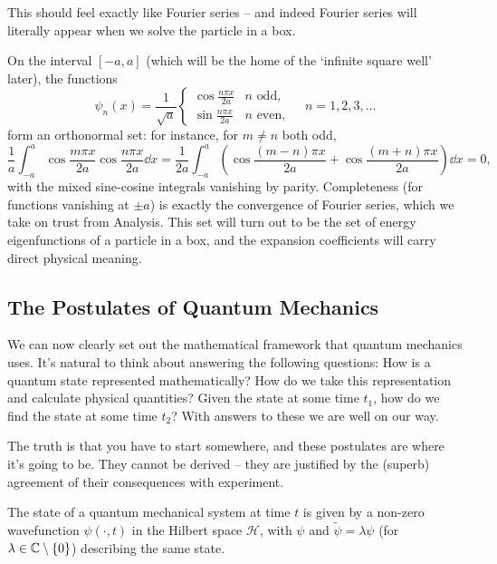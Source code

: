 \documentclass[a4paper]{scrartcl}
\begin{document}
This should feel exactly like Fourier series -- and indeed Fourier series will literally appear when we solve the particle in a box.

\begin{example}
    On the interval $[-a, a]$ (which will be the home of the `infinite square well' later), the functions
    $$
    \psi_n(x) = \frac{1}{\sqrt{a}} \begin{cases} \cos \frac{n \pi x}{2a} & n \text{ odd}, \\[2pt] \sin \frac{n \pi x}{2a} & n \text{ even}, \end{cases} \quad n = 1, 2, 3, \dots
    $$
    form an orthonormal set: for instance, for $m \neq n$ both odd,
    $$
    \frac{1}{a}\int_{-a}^{a} \cos \frac{m \pi x}{2a} \cos \frac{n \pi x}{2a} \dd x = \frac{1}{2a} \int_{-a}^a \left( \cos \frac{(m-n)\pi x}{2a} + \cos\frac{(m+n)\pi x}{2a} \right) \dd x = 0,
    $$
    with the mixed sine-cosine integrals vanishing by parity. Completeness (for functions vanishing at $\pm a$) is exactly the convergence of Fourier series, which we take on trust from Analysis. This set will turn out to be the set of energy eigenfunctions of a particle in a box, and the expansion coefficients will carry direct physical meaning.
\end{example}

\subsection{The Postulates of Quantum Mechanics}

We can now clearly set out the mathematical framework that quantum mechanics uses. It's natural to think about answering the following questions: How is a quantum state represented mathematically? How do we take this representation and calculate physical quantities? Given the state at some time $t_1$, how do we find the state at some time $t_2$? With answers to these we are well on our way.

The truth is that you have to start somewhere, and these postulates are where it's going to be. They cannot be derived -- they are justified by the (superb) agreement of their consequences with experiment.

\begin{axiom}[States]
    The state of a quantum mechanical system at time $t$ is given by a non-zero wavefunction $\psi(\cdot, t)$ in the Hilbert space $\mathcal{H}$, with $\psi$ and $\tilde\psi = \lambda \psi$ (for $\lambda \in \mathbb{C} \setminus \{0\}$) describing the same state.
\end{axiom}
\end{document}
